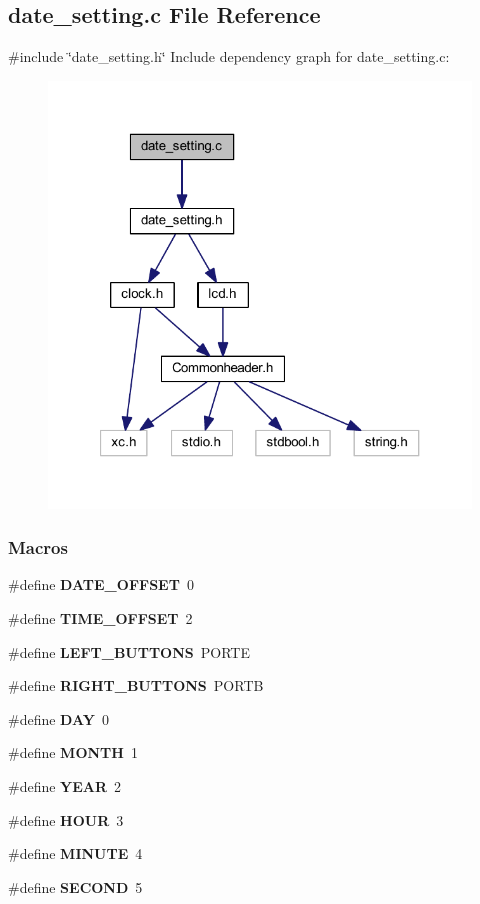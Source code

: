 \subsection{date\+\_\+setting.\+c File Reference}
\label{a00026}
{\ttfamily \#include \char`\"{}date\+\_\+setting.\+h\char`\"{}}\newline
Include dependency graph for date\+\_\+setting.\+c\+:
\nopagebreak
\begin{figure}[H]
\begin{center}
\leavevmode
\includegraphics[width=321pt]{a00027}
\end{center}
\end{figure}
\subsubsection*{Macros}
\begin{DoxyCompactItemize}
\item 
\#define \textbf{ D\+A\+T\+E\+\_\+\+O\+F\+F\+S\+ET}~0
\item 
\#define \textbf{ T\+I\+M\+E\+\_\+\+O\+F\+F\+S\+ET}~2
\item 
\#define \textbf{ L\+E\+F\+T\+\_\+\+B\+U\+T\+T\+O\+NS}~P\+O\+R\+TE
\item 
\#define \textbf{ R\+I\+G\+H\+T\+\_\+\+B\+U\+T\+T\+O\+NS}~P\+O\+R\+TB
\item 
\#define \textbf{ D\+AY}~0
\item 
\#define \textbf{ M\+O\+N\+TH}~1
\item 
\#define \textbf{ Y\+E\+AR}~2
\item 
\#define \textbf{ H\+O\+UR}~3
\item 
\#define \textbf{ M\+I\+N\+U\+TE}~4
\item 
\#define \textbf{ S\+E\+C\+O\+ND}~5
\end{DoxyCompactItemize}

